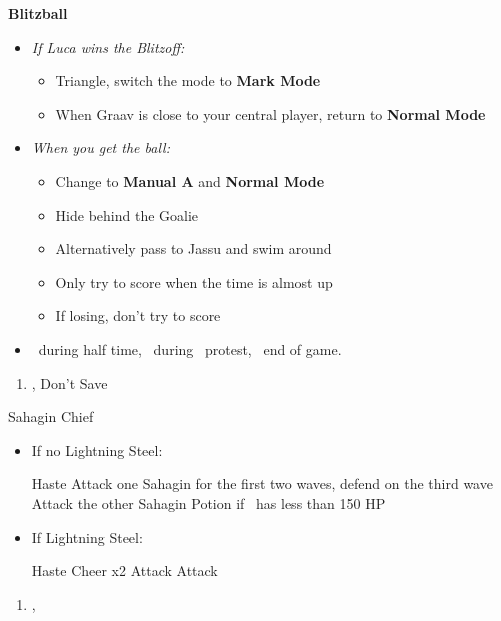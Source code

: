 \begin{trial}
	\textbf{Blitzball}
	\begin{itemize}
		\item \textit{If Luca wins the Blitzoff:}
		\begin{itemize}
			\item Triangle, switch the mode to \textbf{Mark Mode}
			\item When Graav is close to your central player, return to \textbf{Normal Mode}
		\end{itemize}
		\item \textit{When you get the ball:}
		\begin{itemize}
			\item Change to \textbf{Manual A} and \textbf{Normal Mode}
			\item Hide behind the Goalie
			\item Alternatively pass to Jassu and swim around
			\item Only try to score when the time is almost up
			\item If losing, don't try to score
		\end{itemize}
		\item \sd\ during half time, \sd\ during \wakka\ protest, \sd\ end of game.
	\end{itemize}
\end{trial}
\begin{enumerate}[resume]
	\item \cs[1:00], Don't Save
\end{enumerate}
\begin{battle}{Sahagin Chief}
	\begin{itemize}
		\item{If no Lightning Steel:}
		\begin{itemize}
			\tidusf Haste \tidus
			\wakkaf Attack one Sahagin for the first two waves, defend on the third wave
			\tidusf Attack the other Sahagin
			\wakkaf Potion if \tidus\ has less than 150 HP
		\end{itemize}
		\item{If Lightning Steel:}
		\begin{itemize}
			\tidusf Haste \tidus
			\tidusf Cheer x2
			\wakkaf Attack
			\tidusf Attack
		\end{itemize}
	\end{itemize}
\end{battle}
\begin{enumerate}[resume]
	\item \sd, \skippablefmv
\end{enumerate}
